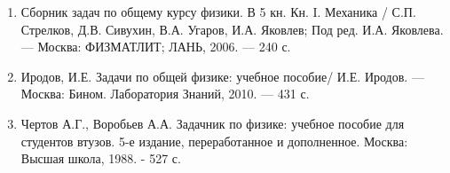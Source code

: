 \begin{enumerate}

\item Сборник задач по общему курсу физики. В 5 кн. Кн. I. Механика /
С.П. Стрелков, Д.В. Сивухин, В.А. Угаров, И.А. Яковлев; Под ред. И.А. Яковлева. — Москва: ФИЗМАТЛИТ; ЛАНЬ, 2006. — 240 с.

\item Иродов, И.Е. Задачи по общей физике: учебное пособие/ И.Е. Иродов. — Москва: Бином. Лаборатория Знаний, 2010. — 431 с.

\item Чертов А.Г., Воробьев А.А. Задачник по физике: учебное пособие для студентов втузов. 5-е издание, переработанное и дополненное. Москва: Высшая школа, 1988. - 527 с.

\end{enumerate}